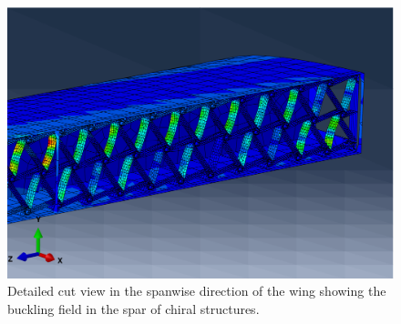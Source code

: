       \begin{figure}[!htpb]
        \centering
        \includegraphics[width=0.8 \textwidth]{figures/wing-model/bucklingWing2}
        \caption[Detailed cut view in the spanwise direction of the wing showing the buckling field in the spar of chiral structures]{Detailed cut view in the spanwise direction of the wing showing the buckling field in the spar of chiral structures.}
        \label{fig:bucklingWing2}
      \end{figure}